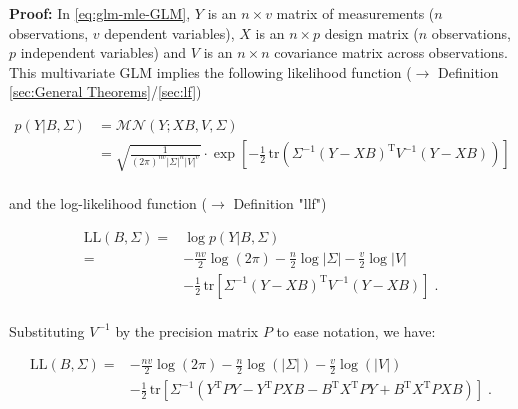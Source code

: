 \documentclass[a4paper,12pt]{book}
\begin{document}
\vspace{1em}
\textbf{Proof:} In \eqref{eq:glm-mle-GLM}, $Y$ is an $n \times v$ matrix of measurements ($n$ observations, $v$ dependent variables), $X$ is an $n \times p$ design matrix ($n$ observations, $p$ independent variables) and $V$ is an $n \times n$ covariance matrix across observations. This multivariate GLM implies the following likelihood function ($\rightarrow$ Definition \ref{sec:General Theorems}/\ref{sec:lf})

\begin{equation} \label{eq:glm-mle-GLM-LF}
\begin{split}
p(Y|B,\Sigma) &= \mathcal{MN}(Y; XB, V, \Sigma) \\
&= \sqrt{\frac{1}{(2\pi)^{nv} |\Sigma|^n |V|^v}} \cdot \exp\left[ -\frac{1}{2} \, \mathrm{tr}\left( \Sigma^{-1} (Y - XB)^\mathrm{T} V^{-1} (Y - XB) \right)  \right] \\
\end{split}
\end{equation}

and the log-likelihood function ($\rightarrow$ Definition "llf")

\begin{equation} \label{eq:glm-mle-GLM-LL1}
\begin{split}
\mathrm{LL}(B,\Sigma) = &\log p(Y|B,\Sigma) \\
= &- \frac{nv}{2} \log(2\pi) - \frac{n}{2} \log |\Sigma| - \frac{v}{2} \log |V| \\
&- \frac{1}{2} \, \mathrm{tr}\left[ \Sigma^{-1} (Y - XB)^\mathrm{T} V^{-1} (Y - XB) \right] \; .\\
\end{split}
\end{equation}

Substituting $V^{-1}$ by the precision matrix $P$ to ease notation, we have:

\begin{equation} \label{eq:glm-mle-GLM-LL2}
\begin{split}
\mathrm{LL}(B,\Sigma) = &- \frac{nv}{2} \log(2\pi) - \frac{n}{2} \log(|\Sigma|) - \frac{v}{2} \log(|V|) \\
&- \frac{1}{2} \, \mathrm{tr}\left[ \Sigma^{-1} \left( Y^\mathrm{T} P Y - Y^\mathrm{T} P X B - B^\mathrm{T} X^\mathrm{T} P Y + B^\mathrm{T} X^\mathrm{T} P X B \right) \right] \; .\\
\end{split}
\end{equation}
\end{document}
